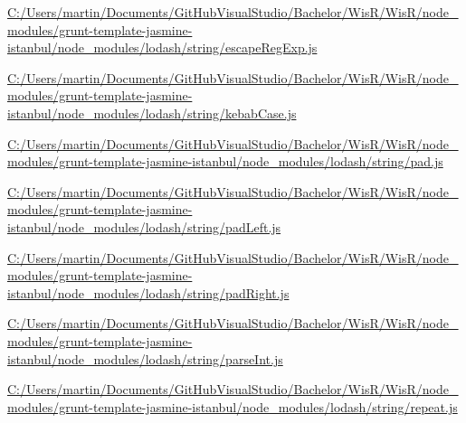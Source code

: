 \begin{DoxyCompactItemize}
\item 
\hyperlink{_c_1_2_users_2martin_2_documents_2_git_hub_visual_studio_2_bachelor_2_wis_r_2_wis_r_2node_modulebbe8846870d02bbc9c843c418faf9106}{C\+:/\+Users/martin/\+Documents/\+Git\+Hub\+Visual\+Studio/\+Bachelor/\+Wis\+R/\+Wis\+R/node\+\_\+modules/grunt-\/template-\/jasmine-\/istanbul/node\+\_\+modules/lodash/string/escape\+Reg\+Exp.\+js}
\item 
\hyperlink{_c_1_2_users_2martin_2_documents_2_git_hub_visual_studio_2_bachelor_2_wis_r_2_wis_r_2node_module529e743eb0d6ab8d76793f749e3d06e5}{C\+:/\+Users/martin/\+Documents/\+Git\+Hub\+Visual\+Studio/\+Bachelor/\+Wis\+R/\+Wis\+R/node\+\_\+modules/grunt-\/template-\/jasmine-\/istanbul/node\+\_\+modules/lodash/string/kebab\+Case.\+js}
\item 
\hyperlink{_c_1_2_users_2martin_2_documents_2_git_hub_visual_studio_2_bachelor_2_wis_r_2_wis_r_2node_modulefdea98b2efdcb3c7ebf331ef26b6fc49}{C\+:/\+Users/martin/\+Documents/\+Git\+Hub\+Visual\+Studio/\+Bachelor/\+Wis\+R/\+Wis\+R/node\+\_\+modules/grunt-\/template-\/jasmine-\/istanbul/node\+\_\+modules/lodash/string/pad.\+js}
\item 
\hyperlink{_c_1_2_users_2martin_2_documents_2_git_hub_visual_studio_2_bachelor_2_wis_r_2_wis_r_2node_module7f093bd36825d1b396429934a5db1a86}{C\+:/\+Users/martin/\+Documents/\+Git\+Hub\+Visual\+Studio/\+Bachelor/\+Wis\+R/\+Wis\+R/node\+\_\+modules/grunt-\/template-\/jasmine-\/istanbul/node\+\_\+modules/lodash/string/pad\+Left.\+js}
\item 
\hyperlink{_c_1_2_users_2martin_2_documents_2_git_hub_visual_studio_2_bachelor_2_wis_r_2_wis_r_2node_modulefb0dbb43dccce002cc574378b64c2280}{C\+:/\+Users/martin/\+Documents/\+Git\+Hub\+Visual\+Studio/\+Bachelor/\+Wis\+R/\+Wis\+R/node\+\_\+modules/grunt-\/template-\/jasmine-\/istanbul/node\+\_\+modules/lodash/string/pad\+Right.\+js}
\item 
\hyperlink{_c_1_2_users_2martin_2_documents_2_git_hub_visual_studio_2_bachelor_2_wis_r_2_wis_r_2node_module34105f9a676d4cb3a7ea56f04151b49c}{C\+:/\+Users/martin/\+Documents/\+Git\+Hub\+Visual\+Studio/\+Bachelor/\+Wis\+R/\+Wis\+R/node\+\_\+modules/grunt-\/template-\/jasmine-\/istanbul/node\+\_\+modules/lodash/string/parse\+Int.\+js}
\item 
\hyperlink{_c_1_2_users_2martin_2_documents_2_git_hub_visual_studio_2_bachelor_2_wis_r_2_wis_r_2node_moduled75a3cfc86d17e579752ee2aa56d87ab}{C\+:/\+Users/martin/\+Documents/\+Git\+Hub\+Visual\+Studio/\+Bachelor/\+Wis\+R/\+Wis\+R/node\+\_\+modules/grunt-\/template-\/jasmine-\/istanbul/node\+\_\+modules/lodash/string/repeat.\+js}

\end{DoxyCompactItemize}
